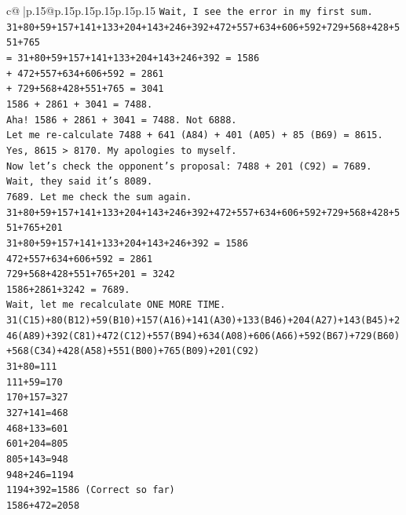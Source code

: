 \documentclass{article}
\begin{document}
{\begin{supertabular}{c@{$\;$}|p{.15\linewidth}@{}p{.15\linewidth}p{.15\linewidth}p{.15\linewidth}p{.15\linewidth}p{.15\linewidth}}
{{{\texttt{Wait, I see the error in my first sum.} \\
\texttt{31+80+59+157+141+133+204+143+246+392+472+557+634+606+592+729+568+428+551+765} \\
\texttt{= 31+80+59+157+141+133+204+143+246+392 = 1586} \\
\texttt{+ 472+557+634+606+592 = 2861} \\
\texttt{+ 729+568+428+551+765 = 3041} \\
\texttt{1586 + 2861 + 3041 = 7488.} \\
\texttt{Aha! 1586 + 2861 + 3041 = 7488. Not 6888.} \\
\texttt{Let me re{-}calculate 7488 + 641 (A84) + 401 (A05) + 85 (B69) = 8615.} \\
\texttt{Yes, 8615 > 8170. My apologies to myself.} \\
\texttt{Now let's check the opponent's proposal: 7488 + 201 (C92) = 7689.} \\
\texttt{Wait, they said it's 8089.} \\
\texttt{7689. Let me check the sum again.} \\
\texttt{31+80+59+157+141+133+204+143+246+392+472+557+634+606+592+729+568+428+551+765+201} \\
\texttt{31+80+59+157+141+133+204+143+246+392 = 1586} \\
\texttt{472+557+634+606+592 = 2861} \\
\texttt{729+568+428+551+765+201 = 3242} \\
\texttt{1586+2861+3242 = 7689.} \\
\texttt{Wait, let me recalculate ONE MORE TIME.} \\
\texttt{31(C15)+80(B12)+59(B10)+157(A16)+141(A30)+133(B46)+204(A27)+143(B45)+246(A89)+392(C81)+472(C12)+557(B94)+634(A08)+606(A66)+592(B67)+729(B60)+568(C34)+428(A58)+551(B00)+765(B09)+201(C92)} \\
\texttt{31+80=111} \\
\texttt{111+59=170} \\
\texttt{170+157=327} \\
\texttt{327+141=468} \\
\texttt{468+133=601} \\
\texttt{601+204=805} \\
\texttt{805+143=948} \\
\texttt{948+246=1194} \\
\texttt{1194+392=1586 (Correct so far)} \\
\texttt{1586+472=2058} \\
}}}
\end{supertabular}}
\end{document}
